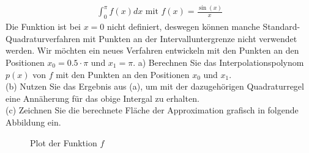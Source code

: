 \documentclass{scrartcl}
\begin{document}
	
	\begin{align*}
	\int_{0}^{\pi} f(x) dx \text{ mit } f(x) = \frac{\sin(x)}{x}
	\end{align*}
	Die Funktion ist bei $x=0$ nicht definiert, deswegen können manche Standard-Quadraturverfahren mit Punkten an der Intervalluntergrenze nicht verwendet werden. 
	\n 
	Wir möchten ein neues Verfahren entwickeln mit den Punkten an den Positionen $x_0 = 0.5 \cdot \pi$ und $x_1 = \pi$.
	\n
	a)
	Berechnen Sie das Interpolationspolynom $p(x)$ von $f$ mit den Punkten an den Positionen $x_0$ und $x_1$.
	\lbreak
	\\
	(b)
	Nutzen Sie das Ergebnis aus (a), um mit der dazugehörigen Quadraturregel eine Annäherung für das obige Intergal zu erhalten.
	\lbreak
	\\
	(c) 
	Zeichnen Sie die berechnete Fläche der Approximation grafisch in folgende Abbildung ein.
	\newpage
	\begin{figure}[ht]
		\centering
		\caption{Plot der Funktion $f$}
	\end{figure}
	
\end{document}
